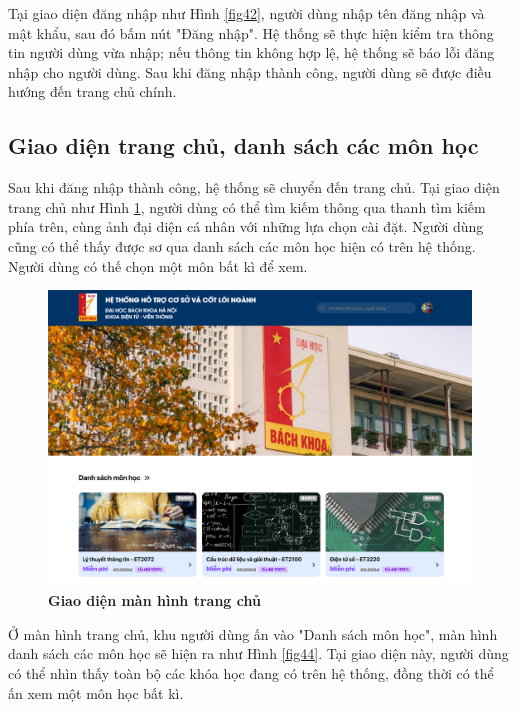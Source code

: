 \documentclass{article}
\begin{document}
	 Tại giao diện đăng nhập như Hình \ref{fig42}, người dùng nhập tên đăng nhập và mật khẩu, sau đó bấm nút "Đăng nhập". Hệ thống sẽ thực hiện kiểm tra thông tin người dùng vừa nhập; nếu thông tin không hợp lệ, hệ thống sẽ báo lỗi đăng nhập cho người dùng. Sau khi đăng nhập thành công, người dùng sẽ được điều hướng đến trang chủ chính.
	 
	 \subsection{Giao diện trang chủ, danh sách các môn học}
	 
	 Sau khi đăng nhập thành công, hệ thống sẽ chuyển đến trang chủ. Tại giao diện trang chủ như Hình \ref{fig43}, người dùng có thể tìm kiếm thông qua thanh tìm kiếm phía trên, cùng ảnh đại diện cá nhân với những lựa chọn cài đặt. Người dùng cũng có thể thấy được sơ qua danh sách các môn học hiện có trên hệ thống. Người dùng có thế chọn một môn bất kì để xem.
	 
	 \begin{figure}[!ht]
	 	\centering
	 	\includegraphics[trim= 10pt 10pt 10pt 10pt, clip, width=14cm]{localhost_3000.png}
	 	\caption [Giao diện màn hình trang chủ]{\bfseries \fontsize{12pt}{0pt}\selectfont Giao diện màn hình trang chủ}
	 	\label{fig43}
	 \end{figure}
	 
	 Ở màn hình trang chủ, khu người dùng ấn vào "Danh sách môn học", màn hình danh sách các môn học sẽ hiện ra như Hình \ref{fig44}. Tại giao diện này, người dùng có thể nhìn thấy toàn bộ các khóa học đang có trên hệ thống, đồng thời có thể ấn xem một môn học bất kì.
	 
\end{document}
